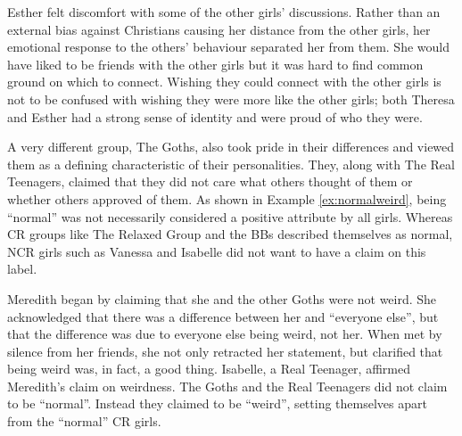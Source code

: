 \vspace{5 mm}

\noindent Esther felt discomfort with some of the other girls' discussions.  Rather than an external bias against Christians causing her distance from the other girls, her emotional response to the others' behaviour separated her from them.  She would have liked to be friends with the other girls but it was hard to find common ground on which to connect.  Wishing they could connect with the other girls is not to be confused with wishing they were more like the other girls; both Theresa and Esther had a strong sense of identity and were proud of who they were.

A very different group, The Goths, also took pride in their differences and viewed them as a defining characteristic of their personalities.  They, along with The Real Teenagers, claimed that they did not care what others thought of them or whether others approved of them.  As shown in Example \ref{ex:normalweird}, being ``normal'' was not necessarily considered a positive attribute by all girls.  Whereas CR groups like The Relaxed Group and the BBs described themselves as normal, NCR girls such as Vanessa and Isabelle did not want to have a claim on this label.

\label{ex:normalweird}

\vspace{5 mm}

\noindent Meredith began by claiming that she and the other Goths were not weird.  She acknowledged that there was a difference between her and ``everyone else'', but that the difference was due to everyone else being weird, not her.  When met by silence from her friends, she not only retracted her statement, but clarified that being weird was, in fact, a good thing.  Isabelle, a Real Teenager, affirmed Meredith's claim on weirdness.  The Goths and the Real Teenagers did not claim to be ``normal''.  Instead they claimed to be ``weird'', setting themselves apart from the ``normal'' CR girls. 

